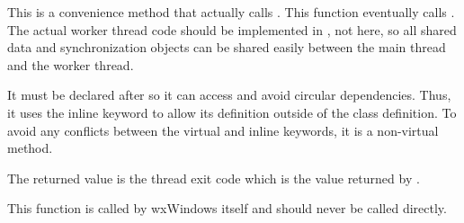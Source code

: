 
This is a convenience method that actually calls
.  This function
eventually calls .
The actual worker thread code should be implemented in
, not here, so all
shared data and synchronization objects can be shared easily between the
main thread and the worker thread.

It must be declared after  so it
can access  and avoid
circular dependencies.  Thus, it uses the inline keyword to allow its
definition outside of the class definition.  To avoid any conflicts
between the virtual and inline keywords, it is a non-virtual method.

The returned value is the thread exit code which is the value returned by
.

This function is called by wxWindows itself and should never be called
directly.

